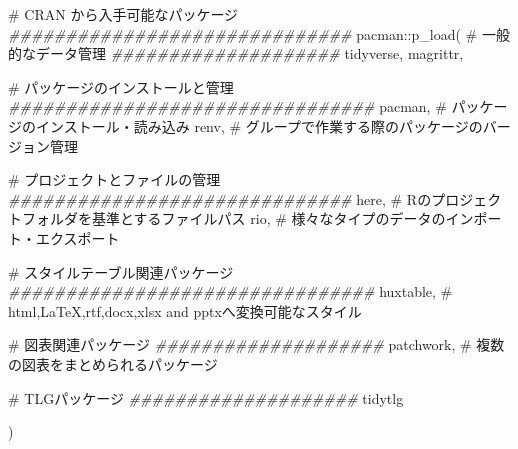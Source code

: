\documentclass[
  letterpaper,
  DIV=11,
  numbers=noendperiod]{scrreprt}
\newenvironment{Shaded}{\begin{snugshade}}{\end{snugshade}}
\newcommand{\CommentTok}[1]{\textcolor[rgb]{0.37,0.37,0.37}{#1}}
\newcommand{\DocumentationTok}[1]{\textcolor[rgb]{0.37,0.37,0.37}{\textit{#1}}}
\newcommand{\FunctionTok}[1]{\textcolor[rgb]{0.28,0.35,0.67}{#1}}
\newcommand{\NormalTok}[1]{\textcolor[rgb]{0.00,0.23,0.31}{#1}}
\newcommand{\SpecialCharTok}[1]{\textcolor[rgb]{0.37,0.37,0.37}{#1}}
\begin{document}
\begin{Shaded}
\begin{Highlighting}[]
\CommentTok{\# CRAN から入手可能なパッケージ}
\DocumentationTok{\#\#\#\#\#\#\#\#\#\#\#\#\#\#\#\#\#\#\#\#\#\#\#\#\#\#\#\#\#\#}
\NormalTok{pacman}\SpecialCharTok{::}\FunctionTok{p\_load}\NormalTok{(}
  \CommentTok{\# 一般的なデータ管理}
  \DocumentationTok{\#\#\#\#\#\#\#\#\#\#\#\#\#\#\#\#\#\#\#\#}
\NormalTok{  tidyverse, }
\NormalTok{  magrittr, }
  
  \CommentTok{\# パッケージのインストールと管理}
  \DocumentationTok{\#\#\#\#\#\#\#\#\#\#\#\#\#\#\#\#\#\#\#\#\#\#\#\#\#\#\#\#\#\#\#\#}
\NormalTok{  pacman,   }\CommentTok{\# パッケージのインストール・読み込み}
\NormalTok{  renv,     }\CommentTok{\# グループで作業する際のパッケージのバージョン管理  }
  
  \CommentTok{\# プロジェクトとファイルの管理}
  \DocumentationTok{\#\#\#\#\#\#\#\#\#\#\#\#\#\#\#\#\#\#\#\#\#\#\#\#\#\#\#\#\#\#}
\NormalTok{  here,     }\CommentTok{\# Rのプロジェクトフォルダを基準とするファイルパス}
\NormalTok{  rio,      }\CommentTok{\# 様々なタイプのデータのインポート・エクスポート}

  \CommentTok{\# スタイルテーブル関連パッケージ}
  \DocumentationTok{\#\#\#\#\#\#\#\#\#\#\#\#\#\#\#\#\#\#\#\#\#\#\#\#\#\#\#\#\#\#\#\#}
\NormalTok{  huxtable,  }\CommentTok{\# html,LaTeX,rtf,docx,xlsx and pptxへ変換可能なスタイル}
  
  \CommentTok{\# 図表関連パッケージ}
  \DocumentationTok{\#\#\#\#\#\#\#\#\#\#\#\#\#\#\#\#\#\#\#\#}
\NormalTok{  patchwork, }\CommentTok{\# 複数の図表をまとめられるパッケージ}
  
  \CommentTok{\# TLGパッケージ}
  \DocumentationTok{\#\#\#\#\#\#\#\#\#\#\#\#\#\#\#\#\#\#\#\#}
\NormalTok{  tidytlg}

\NormalTok{)}
\end{Highlighting}
\end{Shaded}
\end{document}
